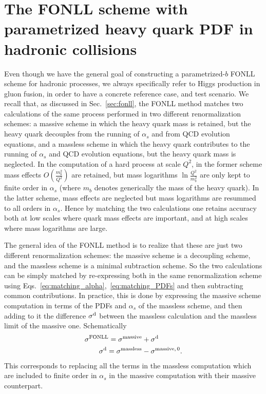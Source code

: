 \section{The FONLL scheme with parametrized heavy quark PDF
  in hadronic collisions}
\label{sec:FONLL-HI}

Even though we have the general goal of constructing a parametrized-$b$
FONLL scheme for hadronic processes, we  always specifically refer to Higgs
production in gluon fusion, in order to have  a concrete reference
case, and  test scenario. We recall that, as discussed in Sec.~\ref{sec:fonll}, the FONLL
method matches two calculations of the same process
performed in two different renormalization schemes: a massive scheme
in which the heavy quark mass is retained, but the heavy quark
decouples from the running of $\alpha_s$ and from QCD evolution
equations, and a massless scheme in which the heavy quark contributes
to the running of $\alpha_s$ and QCD evolution
equations, but the heavy quark mass is neglected.
In the computation of a hard process at scale $Q^2$, in the former scheme
mass effects $O\left(\frac {m_b^2}{Q^2}\right)$
are retained, but mass logarithms $\ln\frac{Q^2}{m_b^2}$
 are only
kept to finite order in $\alpha_s$ (where $m_b$ denotes generically
the mass of the heavy quark). In the latter scheme, mass effects
are neglected but mass logarithms are resummed to all orders in
$\alpha_s$. Hence by matching the two calculations one retains
accuracy both at low scales where quark mass effects are important, and
at high scales where mass logarithms are large.

The general idea of the FONLL method is to realize that these are just
two different renormalization schemes: the massive scheme is a
decoupling scheme, and the massless scheme is a minimal subtraction
scheme. So the two calculations can be simply matched by re-expressing
both in the same renormalization scheme using Eqs.~\ref{eq:matching_alpha},~\ref{eq:matching_PDFs}
and then subtracting common contributions. In practice, this is done by expressing the massive
scheme computation in terms of the PDFs and $\alpha_s$ of the
massless scheme, and then adding to it the difference $\sigma ^{\rm
  d}$
between the massless calculation and the massless limit of the
massive one. Schematically
\begin{align}\label{eq:fonlldef}
&  \sigma^{\text{FONLL}} = \sigma^{\rm massive} +\sigma ^{\rm d}\\
&\qquad \sigma ^{\rm d}=\sigma^{\rm massless}-\sigma^{\rm massive,\,0}.\label{eq:fonlldiff}
\end{align}
This corresponds to replacing all the terms in the massless
computation which are included to finite order in $\alpha_s$ in the
massive computation with their massive counterpart.

